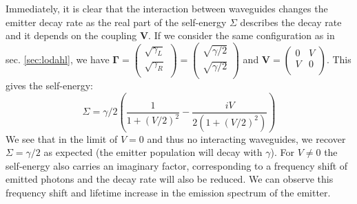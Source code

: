 Immediately, it is clear that the interaction between waveguides changes the emitter decay rate as the real part of the self-energy $\Sigma$ describes the decay rate and it depends on the coupling $\mathbf{V}$. If we consider the same configuration as in sec. \ref{sec:lodahl}, we have $\mathbf{\Gamma} = \begin{pmatrix}
    \sqrt{\gamma_L} \\
    \sqrt{\gamma_R} \\
\end{pmatrix}= \begin{pmatrix}
    \sqrt{\gamma/2} \\
    \sqrt{\gamma/2} \\
\end{pmatrix}$ and $\mathbf{V} =\begin{pmatrix}
    0 & V \\
    V & 0 \\
\end{pmatrix}$. This gives the self-energy:
\begin{equation}
    \Sigma = \gamma/2\left( \frac{1}{1+(V/2)^2} - \frac{i V}{2(1+(V/2)^2)} \right) \label{eq:self}
\end{equation}
We see that in the limit of $V=0$ and thus no interacting waveguides, we recover $\Sigma = \gamma/2$ as expected (the emitter population will decay with $\gamma$). For $V \neq 0$ the self-energy also carries an imaginary factor, corresponding to a frequency shift of emitted photons and the decay rate will also be reduced. We can observe this frequency shift and lifetime increase in the emission spectrum of the emitter.

